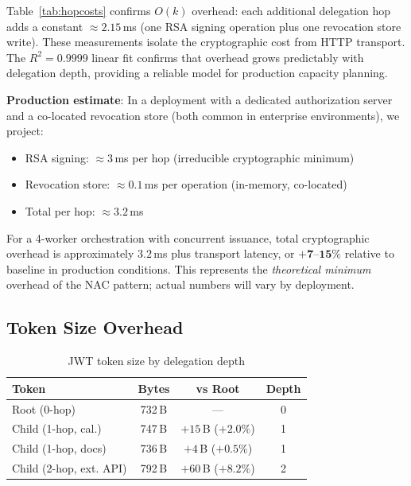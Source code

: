 \documentclass[journal]{IEEEtran}
\begin{document}
Table~\ref{tab:hopcosts} confirms $O(k)$ overhead: each additional delegation
hop adds a constant $\approx 2.15$\,ms (one RSA signing operation plus one
revocation store write). These measurements isolate the cryptographic cost
from HTTP transport. The $R^2 = 0.9999$ linear fit confirms that overhead
grows predictably with delegation depth, providing a reliable model for
production capacity planning.

\textbf{Production estimate}: In a deployment with a dedicated authorization
server and a co-located revocation store (both common in enterprise environments),
we project:
\begin{itemize}
  \item RSA signing: $\approx 3$\,ms per hop (irreducible cryptographic minimum)
  \item Revocation store: $\approx 0.1$\,ms per operation (in-memory, co-located)
  \item Total per hop: $\approx 3.2$\,ms
\end{itemize}

For a 4-worker orchestration with concurrent issuance, total cryptographic
overhead is approximately $3.2$\,ms plus transport latency, or
$\mathbf{+7\text{--}15\%}$ relative to baseline in production conditions.
This represents the \textit{theoretical minimum} overhead of the NAC pattern;
actual numbers will vary by deployment.

\subsection{Token Size Overhead}

\begin{table}[h]
\caption{JWT token size by delegation depth}
\label{tab:tokensizes}
\centering
\footnotesize
\begin{tabular}{lccc}
\toprule
\textbf{Token} & \textbf{Bytes} & \textbf{vs Root} & \textbf{Depth} \\
\midrule
Root (0-hop)             & 732\,B & ---                   & 0 \\
Child (1-hop, cal.)      & 747\,B & $+15$\,B ($+2.0\%$)  & 1 \\
Child (1-hop, docs)      & 736\,B & $+4$\,B ($+0.5\%$)   & 1 \\
Child (2-hop, ext. API)  & 792\,B & $+60$\,B ($+8.2\%$)  & 2 \\
\bottomrule
\end{tabular}
\end{table}
\end{document}
